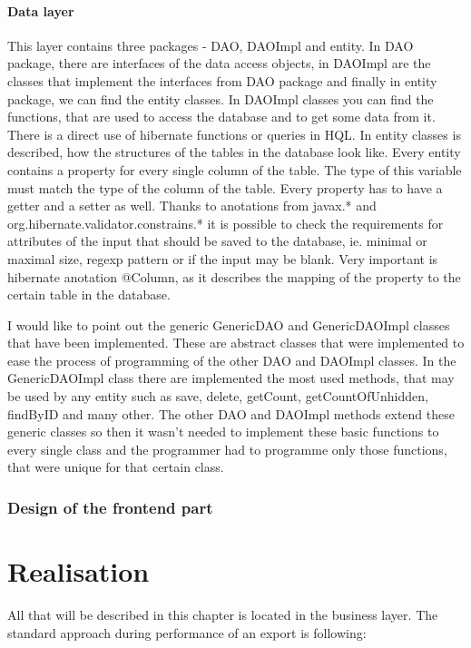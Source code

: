 \documentclass[thesis=B,english]{FITthesis}[2012/10/20]
\begin{document}
\subsubsection{Data layer}
This layer contains three packages - DAO, DAOImpl and entity. In DAO package, there are interfaces of the data access objects, in DAOImpl are the classes that implement the interfaces from DAO package and finally in entity package, we can find the entity classes.
In DAOImpl classes you can find the functions, that are used to access the database and to get some data from it. There is a direct use of hibernate functions or queries in HQL.
In entity classes is described, how the structures of the tables in the database look like. Every entity contains a property for every single column of the table. The type of this variable must match the type of the column of the table. Every property has to have a getter and a setter as well. Thanks to anotations from javax.* and org.hibernate.validator.constrains.* it is possible to check the requirements for attributes of the input that should be saved to the database, ie. minimal or maximal size, regexp pattern or if the input may be blank. Very important is hibernate anotation @Column, as it describes the mapping of the property to the certain table in the database.

I would like to point out the generic GenericDAO and GenericDAOImpl classes that have been implemented.
These are abstract classes that were implemented to ease the process of programming of the other DAO and DAOImpl classes. In the GenericDAOImpl class there are implemented the most used methods, that may be used by any entity such as save, delete, getCount, getCountOfUnhidden, findByID and many other. The other DAO and DAOImpl methods extend these generic classes so then it wasn't needed to implement these basic functions to every single class and the programmer had to programme only those functions, that were unique for that certain class.

\subsection{Design of the frontend part}


	\chapter{Realisation}
All that will be described in this chapter is located in the business layer. The standard approach during performance of an export is following:
\end{document}
